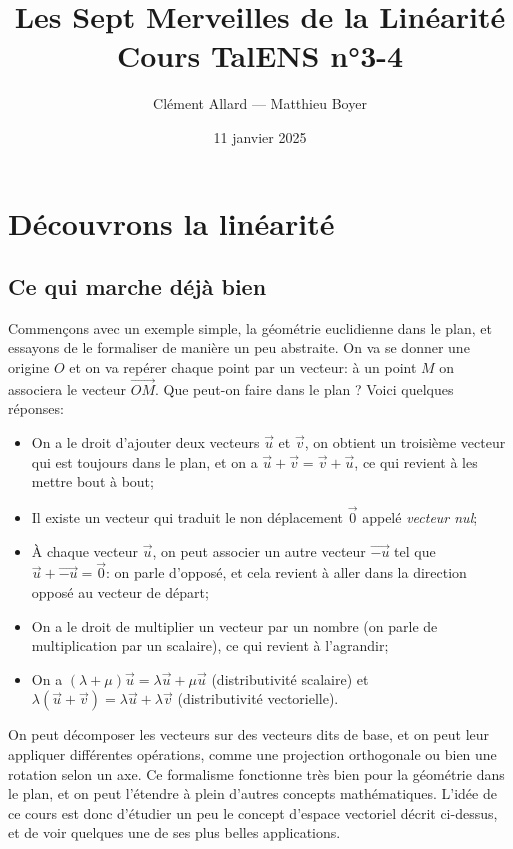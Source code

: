 \documentclass{classe}
\title{Les Sept Merveilles de la Linéarité\\ \small Cours TalENS n°3-4}
\author{Clément Allard --- Matthieu Boyer}
\date{11 janvier 2025}
\begin{document}
\section{Découvrons la linéarité}

\subsection{Ce qui marche déjà bien}

Commençons avec un exemple simple, la géométrie euclidienne dans le plan, et essayons de le formaliser de manière un peu abstraite. On va se donner une origine $O$ et on va repérer chaque point par un vecteur: à un point $M$ on associera le vecteur $\overrightarrow{OM}$. Que peut-on faire dans le plan ? Voici quelques réponses:

\begin{itemize}
	\item On a le droit d'ajouter deux vecteurs $\overrightarrow{u}$ et $\overrightarrow{v}$, on obtient un troisième vecteur qui est toujours dans le plan, et on a $\overrightarrow{u} + \overrightarrow{v} = \overrightarrow{v} + \overrightarrow{u}$, ce qui revient à les mettre bout à bout;
	\item Il existe un vecteur qui traduit le non déplacement $\overrightarrow{0}$ appelé \emph{vecteur nul};
	\item À chaque vecteur $\overrightarrow{u}$, on peut associer un autre vecteur $\overrightarrow{-u}$ tel que $\overrightarrow{u} + \overrightarrow{-u} = \overrightarrow{0}$: on parle d'opposé, et cela revient à aller dans la direction opposé au vecteur de départ;
	\item On a le droit de multiplier un vecteur par un nombre (on parle de multiplication par un scalaire), ce qui revient à l'agrandir;
	\item On a $(\lambda + \mu)\overrightarrow{u} = \lambda\overrightarrow{u} + \mu\overrightarrow{u}$ (distributivité scalaire) et $\lambda(\overrightarrow{u}+\overrightarrow{v}) = \lambda\overrightarrow{u}+\lambda\overrightarrow{v}$ (distributivité vectorielle).
\end{itemize}

On peut décomposer les vecteurs sur des vecteurs dits de base, et on peut leur appliquer différentes opérations, comme une projection orthogonale ou bien une rotation selon un axe. Ce formalisme fonctionne très bien pour la géométrie dans le plan, et on peut l'étendre à plein d'autres concepts mathématiques.
L'idée de ce cours est donc d'étudier un peu le concept d'espace vectoriel décrit ci-dessus, et de voir quelques une de ses plus belles applications.
\end{document}
